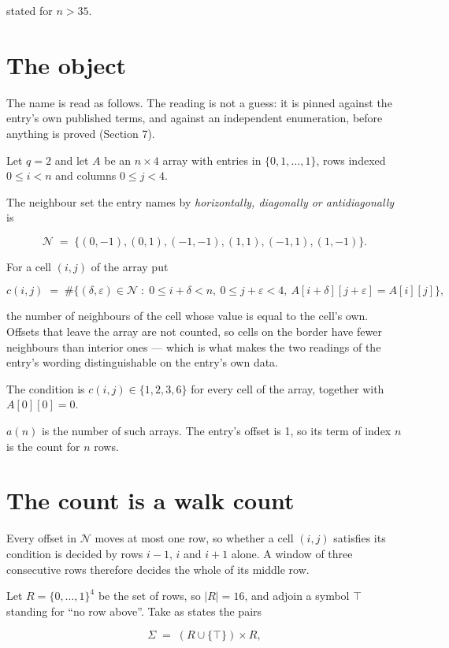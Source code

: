 \documentclass[11pt]{article}
\theoremstyle{definition}
\begin{document}
stated for $n > 35$.

\section{The object}

The name is read as follows. The reading is not a guess: it is pinned against the entry's own published terms, and against an independent enumeration, before anything is proved (Section 7).

Let $q = 2$ and let $A$ be an $n \times 4$ array with entries in $\{0,1,\dots,1\}$, rows indexed $0 \le i < n$ and columns $0 \le j < 4$.

The neighbour set the entry names by {\itshape horizontally, diagonally or antidiagonally} is

\[\mathcal{N} \;=\; \{(0,-1), (0,1), (-1,-1), (1,1), (-1,1), (1,-1)\}.\]

For a cell $(i,j)$ of the array put

\[c(i,j) \;=\; \#\bigl\{(\delta,\varepsilon)\in\mathcal{N} \;:\; 0\le i+\delta<n,\ 0\le j+\varepsilon<4,\ A[i+\delta][j+\varepsilon] = A[i][j]\bigr\},\]

the number of neighbours of the cell whose value is equal to the cell's own. Offsets that leave the array are not counted, so cells on the border have fewer neighbours than interior ones --- which is what makes the two readings of the entry's wording distinguishable on the entry's own data.

The condition is $c(i,j) \in \{1, 2, 3, 6\}$ for every cell of the array, together with $A[0][0]=0$.

$a(n)$ is the number of such arrays. The entry's offset is 1, so its term of index $n$ is the count for $n$ rows.

\section{The count is a walk count}

Every offset in $\mathcal{N}$ moves at most one row, so whether a cell $(i,j)$ satisfies its condition is decided by rows $i-1$, $i$ and $i+1$ alone. A window of three consecutive rows therefore decides the whole of its middle row.

Let $R = \{0,\dots,1\}^{4}$ be the set of rows, so $|R| = 16$, and adjoin a symbol $\top$ standing for ``no row above''. Take as states the pairs

\[\Sigma \;=\; (R \cup \{\top\}) \times R,\]
\end{document}
